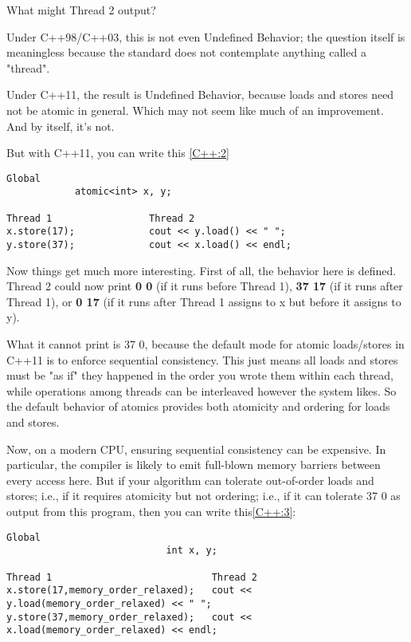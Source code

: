What might Thread 2 output?

Under C++98/C++03, this is not even Undefined Behavior; the question itself is
 meaningless because the standard does not contemplate anything called a
  "thread".

Under C++11, the result is Undefined Behavior, because loads and stores 
need not be atomic in general. Which may not seem like much of an improvement. 
And by itself, it's not.

But with C++11, you can write this \ref{C++:2}


\begin{lstlisting}[label={C++:2},caption={Using atomic in C++}]
            Global
            atomic<int> x, y;

Thread 1                 Thread 2
x.store(17);             cout << y.load() << " ";
y.store(37);             cout << x.load() << endl;
\end{lstlisting}


Now things get much more interesting. First of all, the behavior here is defined.
 Thread 2 could now print \textbf{0 0} (if it runs before Thread 1), 
 \textbf{37 17} (if it runs after Thread 1), or \textbf{0 17} (if it runs after Thread 1 assigns 
 to x but before it assigns to y).

What it cannot print is 37 0, because the default mode for atomic 
loads/stores in C++11 is to enforce sequential consistency.
 This just means all loads and stores must be "as if" they happened
  in the order you wrote them within each thread, while operations 
  among threads can be interleaved however the system likes. 
  So the default behavior of atomics provides both atomicity and 
  ordering for loads and stores.

Now, on a modern CPU, ensuring sequential consistency can be expensive. 
In particular, the compiler is likely to emit full-blown memory barriers 
between every access here. But if your algorithm can tolerate out-of-order 
loads and stores; i.e., if it requires atomicity but not ordering; i.e., 
if it can tolerate 37 0 as output from this program, then you can write this\ref{C++:3}:


\begin{lstlisting}[label={C++:3},caption={Using memory\_order\_relaxed in C++}]
                            Global
                            int x, y;

Thread 1                            Thread 2
x.store(17,memory_order_relaxed);   cout << y.load(memory_order_relaxed) << " ";
y.store(37,memory_order_relaxed);   cout << x.load(memory_order_relaxed) << endl;
\end{lstlisting}


